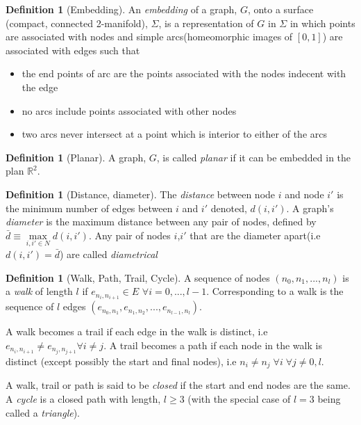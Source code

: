 \documentclass[a4paper,10pt]{article}
\theoremstyle{definition}
\newtheorem{definition}[theorem]{Definition}
\theoremstyle{definition}
\theoremstyle{remark}
\theoremstyle{definition}
\begin{document}
\begin{definition}[Embedding]
An \textit{embedding} of a graph, $G$, onto a surface (compact, connected 2-manifold), $\Sigma$, is a representation of $G$ in $\Sigma$ in which points are associated with nodes and simple arcs(homeomorphic images of $[0,1]$) are associated with edges such that
\begin{itemize}
\item the end points of arc are the points associated with the nodes indecent with the edge
\item no arcs include points associated with other nodes
\item two arcs never intersect at a point which is interior to either of the arcs
\end{itemize}
\end{definition}

\begin{definition}[Planar]
A graph, $G$, is called \textit{planar} if it can be embedded in the plan $\mathbb{R}^{2}$.
\end{definition}

\begin{definition}[Distance, diameter]
The \textit{distance} between node $i$ and node $i'$ is the minimum number of edges between $i$ and $i'$ denoted, $d(i,i')$.
A graph's \textit{diameter} is the maximum distance between any pair of nodes, defined by $\bar{d} \equiv \max\limits_{i,i' \in N} d(i,i')$. Any pair of nodes $i$,$i'$ that are the diameter apart(i.e $d(i,i')=\bar{d}$) are called \textit{diametrical} 
\end{definition}

\begin{definition}[Walk, Path, Trail, Cycle]
A sequence of nodes $(n_{0},n_{1},...,n_{l})$ is a \textit{walk} of length $l$ if $e_{n_{i},n_{i+1}} \in E$ $\forall i=0,...,l-1$. Corresponding to a walk is the sequence of $l$ edges $(e_{n_{0},n_{1}},e_{n_{1},n_{2}},...,e_{n_{l-1},n_{l}})$.

A walk becomes a trail if each edge in the walk is distinct, i.e $e_{n_{i},n_{i+1}} \neq e_{n_{j},n_{j+1}} \forall i \neq j$. A trail becomes a path if each node in the walk is distinct (except possibly the start and final nodes), i.e $n_{i} \neq n_{j} \; \forall i \; \forall j \neq 0,l$.

A walk, trail or path is said to be \textit{closed} if the start and end nodes are the same. A \textit{cycle} is a closed path with length, $l \geq 3$ (with the special case of $l=3$ being called a \textit{triangle}).
\end{definition}
\end{document}
